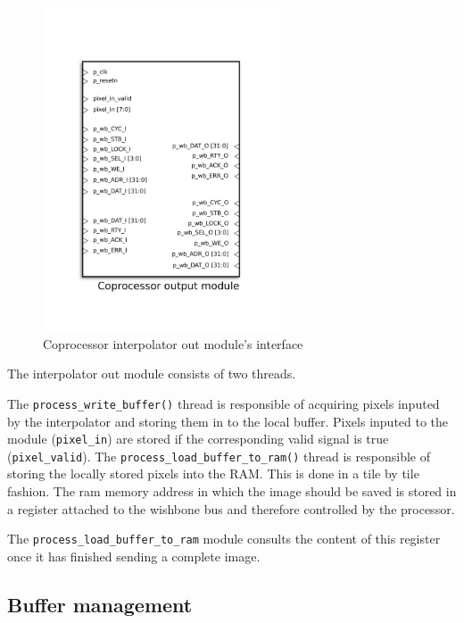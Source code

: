 \begin{figure}[H]
\center
\includegraphics[width=7cm]{figs/INTERPOLATOR_OUT.pdf}
\caption{Coprocessor interpolator out module's interface}
\label{interpo_out_ports}
\end{figure}



The interpolator out module consists of two threads. 

The \texttt{process\_write\_buffer()} thread is responsible of acquiring pixels inputed by the interpolator and storing them in to the local buffer. Pixels inputed to the module (\texttt{pixel\_in}) are stored if the corresponding valid signal is true (\texttt{pixel\_valid}). The \texttt{process\_load\_buffer\_to\_ram()} thread is responsible of storing the locally stored pixels into the RAM. This is done in a tile by tile fashion. The ram memory address in which the image should be saved is stored in a register attached to the wishbone bus and therefore controlled by the processor. 

The \texttt{process\_load\_buffer\_to\_ram} module consults the content of this register once it has finished sending a complete image.

\subsection{Buffer management}

